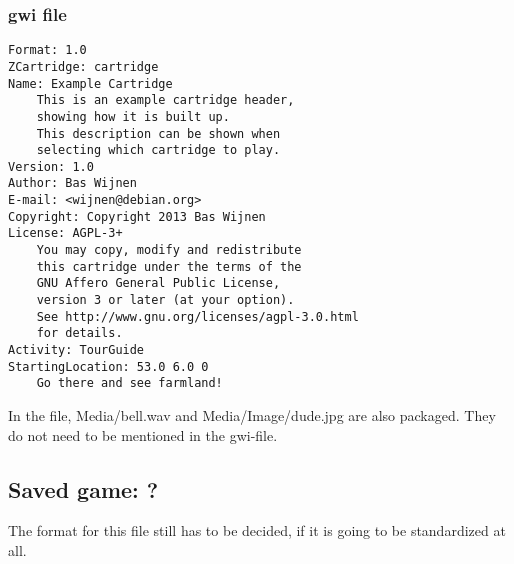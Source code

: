 \documentclass{article}
\begin{document}
\subsubsection{gwi file}
\noindent\begin{lstlisting}
Format: 1.0
ZCartridge: cartridge
Name: Example Cartridge
	This is an example cartridge header,
	showing how it is built up.
	This description can be shown when
	selecting which cartridge to play.
Version: 1.0
Author: Bas Wijnen
E-mail: <wijnen@debian.org>
Copyright: Copyright 2013 Bas Wijnen
License: AGPL-3+
	You may copy, modify and redistribute
	this cartridge under the terms of the
	GNU Affero General Public License,
	version 3 or later (at your option).
	See http://www.gnu.org/licenses/agpl-3.0.html
	for details.
Activity: TourGuide
StartingLocation: 53.0 6.0 0
	Go there and see farmland!
\end{lstlisting}

In the file, Media/bell.wav and Media/Image/dude.jpg are also packaged. They do
not need to be mentioned in the gwi-file.

\subsection{Saved game: ?}
The format for this file still has to be decided, if it is going to be
standardized at all.
\end{document}
